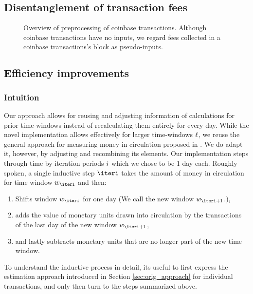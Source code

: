 \subsection{Disentanglement of  transaction fees}
\label{sec:improve_fees}%
\begin{figure}[t]
	
	\centering
	\caption{Overview of preprocessing of coinbase transactions. Although coinbase transactions have no inputs, we regard fees collected in a coinbase transactions's block as pseudo-inputs.}
\end{figure}



\subsection{Efficiency improvements}
\label{sec:novel_impl}%

\subsubsection{Intuition}
Our approach allows for reusing and adjusting information of calculations for prior time-windows instead of recalculating them entirely for every day. %
While the novel implementation allows effectively for larger time-windows \({\ell}\), we reuse the general approach for measuring money in circulation proposed in \cite{pernice2019cryptocurrencies}. %
We do adapt it, however, by adjusting and recombining its elements. %
Our implementation steps through time by iteration periods \({i}\) which we chose to be 1 day each. %
Roughly spoken, a single inductive step \(\iteri\) takes the amount of money in circulation for time window \(\wndw_\iteri\) and then: %
\begin{enumerate}
\item Shifts window \(\wndw_\iteri\) for one day (We call the new window \(\wndw_{\iteri+1}\).),
\item adds the value of monetary units drawn into circulation by the transactions of the last day of the new window \(\wndw_{\iteri+1}\), %
\item and lastly subtracts monetary units that are no longer part of the new time window. %
\end{enumerate}
To understand the inductive process in detail, its useful to first express the estimation approach introduced in Section \ref{sec:orig_approach} for individual transactions, and only then turn to the steps summarized above. %

